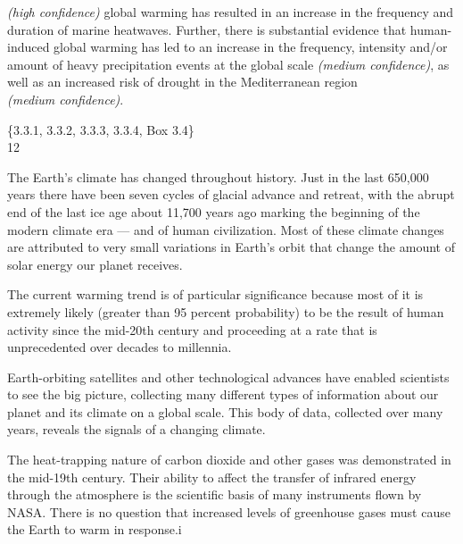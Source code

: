 \documentclass{article} %
\begin{document}
\textit{(high confidence)} global warming has resulted in an 
increase in the frequency and duration of marine heatwaves. Further,
there is substantial evidence that human-induced global warming has 
led to an increase in the frequency, intensity and/or amount of heavy
precipitation events at the global scale \textit{(medium confidence)},
as well as an increased risk of drought in the Mediterranean region\\

\textit{(medium confidence)}.

{\footnotesize \{3.3.1, 3.3.2, 3.3.3, 3.3.4, Box 3.4\} }\\

12

The Earth's climate has changed throughout history. Just in the last 650,000
years there have been seven cycles of glacial advance and retreat, with the
abrupt end of the last ice age about 11,700 years ago marking the beginning of
the modern climate era — and of human civilization. Most of these climate
changes are attributed to very small variations in Earth’s orbit that change
the amount of solar energy our planet receives.

\begin{flushright}
	The current warming trend is of particular significance because most of it is
	extremely likely (greater than 95 percent probability) to be the result of
	human activity since the mid-20th century and proceeding at a rate that is
	unprecedented over decades to millennia.
\end{flushright}

\begin{flushleft}
	Earth-orbiting satellites and other technological advances have enabled
	scientists to see the big picture, collecting many different types of
	information about our planet and its climate on a global scale. This body of
	data, collected over many years, reveals the signals of a changing climate.
\end{flushleft}

\begin{center}
	The heat-trapping nature of carbon dioxide and other gases was demonstrated in
	the mid-19th century. Their ability to affect the transfer of infrared energy
	through the atmosphere is the scientific basis of many instruments flown by
	NASA. There is no question that increased levels of greenhouse gases must cause
	the Earth to warm in response.i
\end{center}
\end{document}

